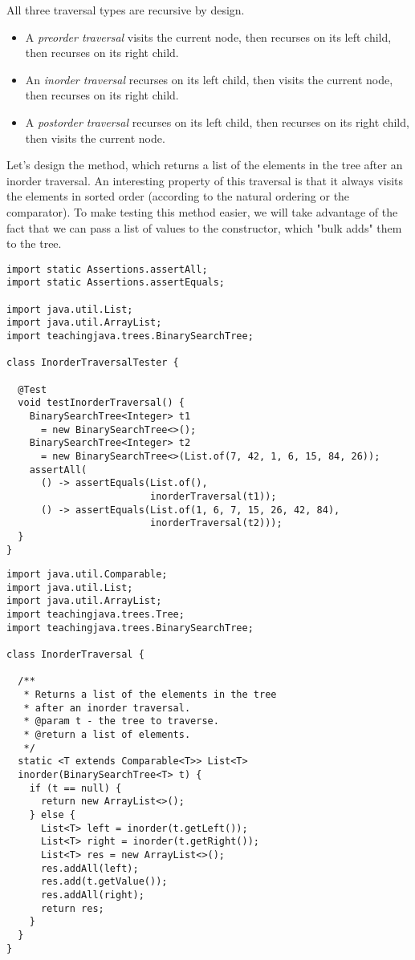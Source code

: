 All three traversal types are recursive by design.
\begin{itemize}
  \item A \emph{preorder traversal} visits the current node, then recurses on its left child, then recurses on its right child.
  \item An \emph{inorder traversal} recurses on its left child, then visits the current node, then recurses on its right child.
  \item A \emph{postorder traversal} recurses on its left child, then recurses on its right child, then visits the current node.
\end{itemize}

Let's design the  method, which returns a list of the elements in the tree after an inorder traversal. 
An interesting property of this traversal is that it always visits the elements in sorted order (according to the natural ordering or the comparator). 
To make testing this method easier, we will take advantage of the fact that we can pass a list of values to the  constructor, which "bulk adds" them to the tree.

\enlargethispage{-2\baselineskip}
\begin{lstlisting}[language=MyJava]
import static Assertions.assertAll;
import static Assertions.assertEquals;

import java.util.List;
import java.util.ArrayList;
import teachingjava.trees.BinarySearchTree;

class InorderTraversalTester {

  @Test
  void testInorderTraversal() {
    BinarySearchTree<Integer> t1 
      = new BinarySearchTree<>();
    BinarySearchTree<Integer> t2 
      = new BinarySearchTree<>(List.of(7, 42, 1, 6, 15, 84, 26));
    assertAll(
      () -> assertEquals(List.of(), 
                         inorderTraversal(t1));
      () -> assertEquals(List.of(1, 6, 7, 15, 26, 42, 84), 
                         inorderTraversal(t2)));
  }
}

\end{lstlisting}

\begin{lstlisting}[language=MyJava]
import java.util.Comparable;
import java.util.List;
import java.util.ArrayList;
import teachingjava.trees.Tree;
import teachingjava.trees.BinarySearchTree;

class InorderTraversal {

  /**
   * Returns a list of the elements in the tree 
   * after an inorder traversal.
   * @param t - the tree to traverse.
   * @return a list of elements.
   */
  static <T extends Comparable<T>> List<T> 
  inorder(BinarySearchTree<T> t) {
    if (t == null) {
      return new ArrayList<>();
    } else {
      List<T> left = inorder(t.getLeft());
      List<T> right = inorder(t.getRight());
      List<T> res = new ArrayList<>();
      res.addAll(left);
      res.add(t.getValue());
      res.addAll(right);
      return res;
    }
  }
}
\end{lstlisting}

